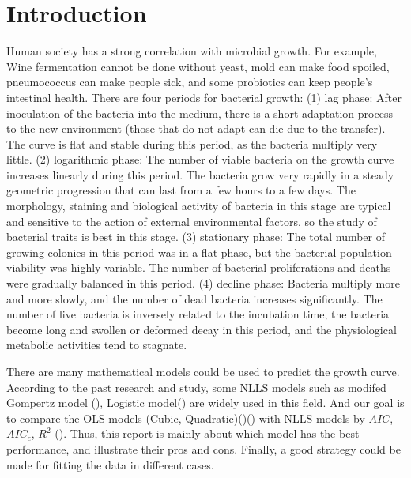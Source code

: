 \documentclass[11pt]{article}
\begin{document}
 \section{Introduction}
 Human society has a strong correlation with microbial growth. For example, Wine fermentation cannot be done without yeast, mold can make food spoiled, pneumococcus can make people sick, and some probiotics can keep people's intestinal health.
  There are four periods for bacterial growth:
  \newline
  (1) lag phase: After inoculation of the bacteria into the medium, there is a short adaptation process to the new environment (those that do not adapt can die due to the transfer). The curve is flat and stable during this period, as the bacteria multiply very little.
  \newline
  (2) logarithmic phase: The number of viable bacteria on the growth curve increases linearly during this period. The bacteria grow very rapidly in a steady geometric progression that can last from a few hours to a few days. The morphology, staining and biological activity of bacteria in this stage are typical and sensitive to the action of external environmental factors, so the study of bacterial traits is best in this stage.
  \newline
  (3) stationary phase: The total number of growing colonies in this period was in a flat phase, but the bacterial population viability was highly variable. The number of bacterial proliferations and deaths were gradually balanced in this period.
  \newline
  (4) decline phase: Bacteria multiply more and more slowly, and the number of dead bacteria increases significantly. The number of live bacteria is inversely related to the incubation time, the bacteria become long and swollen or deformed decay in this period, and the physiological metabolic activities tend to stagnate.
 
  There are many mathematical models could be used to predict the growth curve. According to the past research and study, some NLLS models such as modifed Gompertz model (\citealt{PMID:16348228}), Logistic model(\citealt{MARCHETTI19961}) are widely used in this field.
  And our goal is to compare the OLS models (Cubic, Quadratic)(\citealt{SAKANOUE2007159})(\citealt{GELADI19861}) with NLLS models by $AIC$, $AIC_c$, $R^2$ (\citealt{10.1093/biomet/78.3.499}).
  Thus, this report is mainly about which model has the best performance, and illustrate their pros and cons. Finally, a good strategy could be made for fitting the data in different cases.
\end{document}
